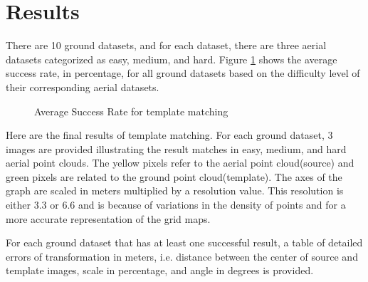 \documentclass[11pt]{article}
\begin{document}
    \section{Results}
    There are 10 ground datasets, and for each dataset, there are three aerial datasets categorized as easy, medium,
    and hard. Figure \ref{fig:asr} shows the average success rate, in percentage, for all ground datasets based on the
    difficulty level of their corresponding aerial datasets.
    \begin{figure}
        \centering
        \caption{Average Success Rate for template matching}
        \label{fig:asr}
    \end{figure}

    Here are the final results of template matching. For each ground dataset, 3 images are provided illustrating the
    result matches in easy, medium, and hard aerial point clouds. The yellow pixels refer to the aerial point cloud(source)
    and green pixels are related to the ground point cloud(template). The axes of the graph are scaled in meters multiplied
    by a resolution value. This resolution is either 3.3 or 6.6 and is because of variations in the density of points
    and for a more accurate representation of the grid maps.

    For each ground dataset that has at least one successful result, a table of detailed errors of transformation
    in meters, i.e. distance between the center of source and template images, scale in percentage, and angle in
    degrees is provided.
\end{document}
